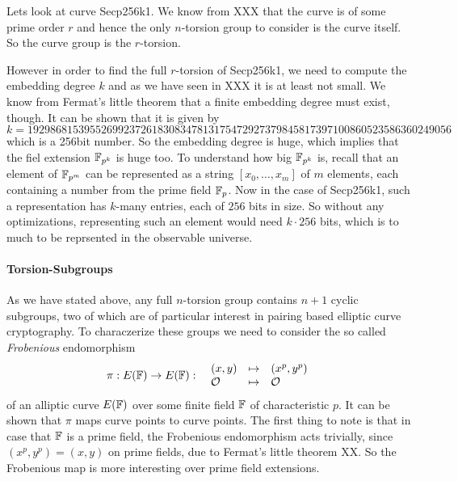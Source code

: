 \begin{example} 
Lets look at curve Secp256k1. We know from XXX that the curve is of some prime order $r$ and hence the only $n$-torsion group to consider is the curve itself. So the curve group is the $r$-torsion. 

However in order to find the full $r$-torsion of Secp256k1, we need to compute the embedding degree $k$ and as we have seen in XXX it is at least not small. We know from Fermat's little theorem that a finite embedding degree must exist, though. It can be shown that it is given by
$$
k = \scriptstyle 192986815395526992372618308347813175472927379845817397100860523586360249056 
$$
which is a 256bit number. So the embedding degree is huge, which implies that the fiel extension $\mathbb{F}_{p^k}$ is huge too. To understand how big $\mathbb{F}_{p^k}$ is, recall that an element of $\mathbb{F}_{p^m}$ can be represented as a string $[x_0,\ldots,x_m]$ of $m$ elements, each containing a number from the prime field $\mathbb{F}_p$. Now in the case of Secp256k1, such a representation has $k$-many entries, each of $256$ bits in size. So without any optimizations, representing such an element would need $k\cdot 256$ bits, which is to much to be reprsented in the observable universe.
\end{example}
\paragraph{Torsion-Subgroups}As we have stated above, any full $n$-torsion group contains $n+1$ cyclic subgroups, two of which are of particular interest in pairing based elliptic curve cryptography. To characzerize these groups we need to consider the so called \textit{Frobenious} endomorphism
\begin{equation}
\pi : E(\mathbb{F}) \to E(\mathbb{F}): \;\; 
\begin{array}{lcl}
(x,y)       &\mapsto & (x^p,y^p)\\
\mathcal{O} &\mapsto & \mathcal{O}
\end{array} 
\end{equation}
of an alliptic curve $E(\mathbb{F})$ over some finite field $\mathbb{F}$ of characteristic $p$. It can be shown that $\pi$ maps curve points to curve points. The first thing to note is that in case that $\mathbb{F}$ is a prime field, the Frobenious endomorphism acts trivially, since $(x^p,y^p) = (x,y)$ on prime fields, due to Fermat's little theorem XX. So the Frobenious map is more interesting over prime field extensions.

